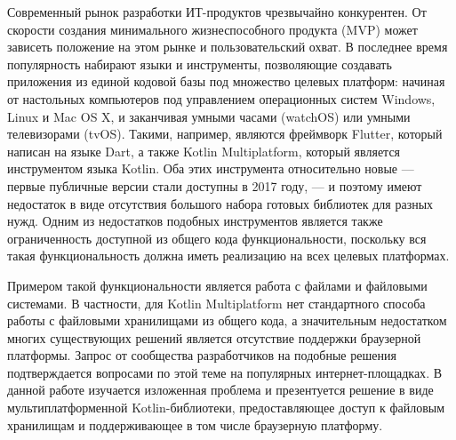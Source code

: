 


Современный рынок разработки ИТ-продуктов чрезвычайно конкурентен. От скорости создания  минимального жизнеспособного продукта (MVP) может зависеть положение на этом рынке и пользовательский охват. В последнее время популярность набирают языки и инструменты, позволяющие создавать приложения из единой кодовой базы под множество целевых платформ: начиная от настольных компьютеров под управлением операционных систем Windows, Linux и Mac OS X, и заканчивая умными часами (watchOS) или умными телевизорами (tvOS). Такими, например, являются фреймворк Flutter, который написан на языке Dart, а также Kotlin Multiplatform, который является инструментом языка Kotlin. Оба этих инструмента относительно новые --- первые публичные версии стали доступны в 2017 году, --- и поэтому имеют недостаток в виде отсутствия большого набора готовых библиотек для разных нужд. Одним из недостатков подобных инструментов является также ограниченность доступной из общего кода функциональности, поскольку вся такая функциональность должна иметь реализацию на всех целевых платформах.

Примером такой функциональности является работа с файлами и файловыми системами. В частности, для Kotlin Multiplatform нет стандартного способа работы с файловыми хранилищами из общего кода, а значительным недостатком многих существующих решений является отсутствие поддержки браузерной платформы. Запрос от сообщества разработчиков на подобные решения подтверждается вопросами по этой теме на популярных интернет-площадках\cite{so-file-io-with-kotlin-multiplatform, so-read-write-file-in-kotlin-native-ios-side, reddit-multiplatform-file-io, reddit-kotlin-native-library-io, kotlinlang-multiplatform-file-interaction}. В данной работе изучается изложенная проблема и презентуется решение в виде мультиплатформенной Kotlin-библиотеки, предоставляющее доступ к файловым хранилищам и поддерживающее в том числе браузерную платформу.


